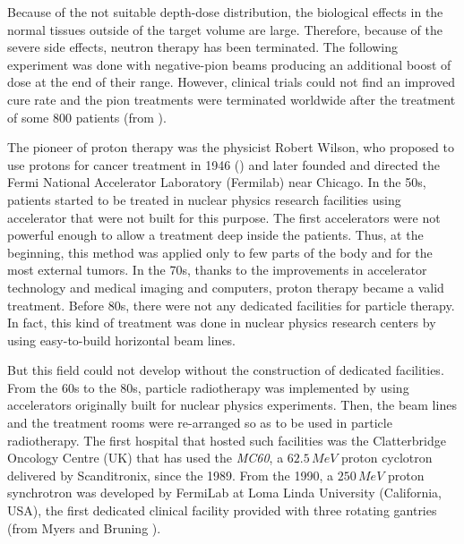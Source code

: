 \documentclass[12pt, a4paper, twoside]{book}
\begin{document}
Because of the not suitable depth-dose distribution, the biological effects in the normal tissues outside of the target volume are large. Therefore, because of the severe side effects, neutron therapy has been terminated.
The following experiment was done with negative-pion beams producing an additional boost of dose at the end of their range. However, clinical trials could not find an improved cure rate and the pion treatments were terminated worldwide after the treatment of some 800 patients (from \cite{blatt:pio}).

The pioneer of proton therapy was the physicist Robert Wilson, who proposed to use protons for cancer treatment in 1946 (\cite{wils:hadr}) and later founded and directed the Fermi National Accelerator Laboratory (Fermilab) near Chicago.
In the 50s, patients started to be treated in nuclear physics research facilities using accelerator that were not built for this purpose.
The first accelerators were not powerful enough to allow a treatment deep inside the patients. Thus, at the beginning, this method was applied only to few parts of the body and for the most external tumors.
In the 70s, thanks to the improvements in accelerator technology and medical imaging and computers, proton therapy became a valid treatment.
Before 80s, there were not any dedicated facilities for particle therapy. In fact, this kind of treatment was done in nuclear physics research centers by using easy-to-build horizontal beam lines.

But this field could not develop without the construction of dedicated facilities. 
From the 60s to the 80s, particle radiotherapy was implemented by using accelerators originally built for nuclear physics experiments. Then, the beam lines and the treatment rooms were re-arranged so as to be used in particle radiotherapy. The first hospital that hosted such facilities was the Clatterbridge Oncology Centre (UK) that has used the \emph{MC60}, a $62.5\,MeV$ proton cyclotron delivered by Scanditronix, since the 1989. From the 1990, a $250\,MeV$ proton synchrotron was developed by FermiLab at Loma Linda University (California, USA), the first dedicated clinical facility provided with three rotating gantries (from Myers and Bruning \cite{mye:acc}).
\end{document}
